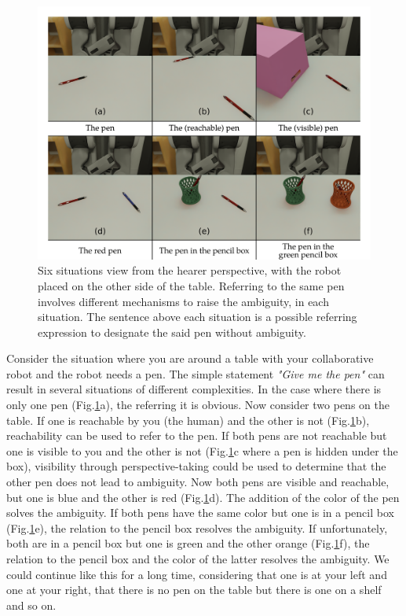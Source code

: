 \begin{figure}[h!]
\centering
\includegraphics[scale=0.16]{figures/chapter4/intro.png}
\caption{\label{fig:chap4_intro} Six situations view from the hearer perspective, with the robot placed on the other side of the table. Referring to the same pen involves different mechanisms to raise the ambiguity, in each situation. The sentence above each situation is a possible referring expression to designate the said pen without ambiguity. }
\end{figure}

Consider the situation where you are around a table with your collaborative robot and the robot needs a pen. The simple statement \textit{"Give me the pen"} can result in several situations of different complexities. In the case where there is only one pen (Fig.\ref{fig:chap4_intro}a), the referring it is obvious. Now consider two pens on the table. If one is reachable by you (the human) and the other is not (Fig.\ref{fig:chap4_intro}b), reachability can be used to refer to the pen. If both pens are not reachable but one is visible to you and the other is not (Fig.\ref{fig:chap4_intro}c where a pen is hidden under the box), visibility through perspective-taking could be used to determine that the other pen does not lead to ambiguity. Now both pens are visible and reachable, but one is blue and the other is red (Fig.\ref{fig:chap4_intro}d). The addition of the color of the pen solves the ambiguity. If both pens have the same color but one is in a pencil box (Fig.\ref{fig:chap4_intro}e), the relation to the pencil box resolves the ambiguity. If unfortunately, both are in a pencil box but one is green and the other orange (Fig.\ref{fig:chap4_intro}f), the relation to the pencil box and the color of the latter resolves the ambiguity. We could continue like this for a long time, considering that one is at your left and one at your right, that there is no pen on the table but there is one on a shelf and so on.

